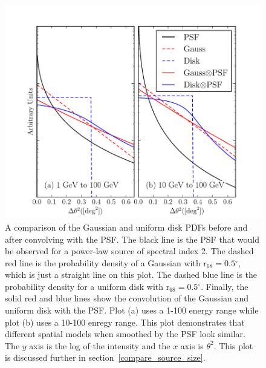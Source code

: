 \documentclass[12pt,preprint]{aastex}
\newcommand{\gev}{\text{GeV}\xspace}
\newcommand{\rsixeight}{{\ensuremath{\text{r}_{68}}}\xspace}
\renewcommand{\deg}{\ensuremath{^\circ}\xspace}
\begin{document}
\begin{figure}
  \begin{center}
    \includegraphics{mc_plots/compare_disk_gauss.pdf}
    \end{center}
    \caption{
    A comparison of the Gaussian and uniform disk PDFs before and
    after convolving with the PSF.  The black line is the PSF that
    would be observed for a power-law source of spectral index 2. The
    dashed red line is the probability density of a Gaussian with
    $\rsixeight=0.5\deg$, which is just a straight line on this plot.
    The dashed blue line is the probability density for a uniform disk
    with $\rsixeight=0.5\deg$.  Finally, the solid red and blue lines
    show the convolution of the Gaussian and uniform disk with the PSF.
    Plot (a) uses a 1-100 \gev energy range while plot (b)
    uses a 10-100 \gev enregy range. This plot demonstrates that different
    spatial models when smoothed by the PSF look similar.  The $y$
    axis is the log of the intensity and the $x$ axis is $\theta^2$.
    This plot is discussed further in section~\ref{compare_source_size}.
    }\label{compare_disk_gauss}
  \end{figure}
\end{document}
